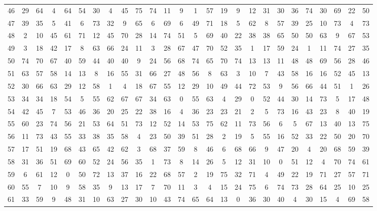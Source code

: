 \begin{table}
\begin{tabular}{c c c c c c c c c c c c c c c c c c c c c c c c c c }
46 & 29 & 64 & 4 & 64 & 54 & 30 & 4 & 45 & 75 & 74 & 11 & 9 & 1 & 57 & 19 & 9 & 12 & 31 & 30 & 36 & 74 & 30 & 69 & 22 & 50 \\
47 & 39 & 35 & 5 & 41 & 6 & 73 & 32 & 9 & 65 & 6 & 69 & 6 & 49 & 71 & 18 & 5 & 62 & 8 & 57 & 39 & 25 & 10 & 73 & 4 & 73 \\
48 & 2 & 10 & 45 & 61 & 71 & 12 & 45 & 70 & 28 & 14 & 74 & 51 & 5 & 69 & 40 & 22 & 38 & 38 & 65 & 50 & 50 & 63 & 9 & 67 & 53 \\
49 & 3 & 18 & 42 & 17 & 8 & 63 & 66 & 24 & 11 & 3 & 28 & 67 & 47 & 70 & 52 & 35 & 1 & 17 & 59 & 24 & 1 & 11 & 74 & 27 & 35 \\
50 & 74 & 70 & 67 & 40 & 59 & 44 & 40 & 40 & 9 & 24 & 56 & 68 & 74 & 65 & 70 & 74 & 13 & 13 & 11 & 48 & 48 & 69 & 56 & 28 & 46 \\
51 & 63 & 57 & 58 & 14 & 13 & 8 & 16 & 55 & 31 & 66 & 27 & 48 & 56 & 8 & 63 & 3 & 10 & 7 & 43 & 58 & 16 & 16 & 52 & 45 & 13 \\
52 & 30 & 66 & 63 & 29 & 12 & 58 & 1 & 4 & 18 & 67 & 55 & 12 & 29 & 10 & 49 & 44 & 72 & 53 & 9 & 56 & 66 & 44 & 51 & 1 & 26 \\
53 & 34 & 34 & 18 & 54 & 5 & 55 & 62 & 67 & 67 & 34 & 63 & 0 & 55 & 63 & 4 & 29 & 0 & 52 & 44 & 30 & 14 & 73 & 5 & 17 & 48 \\
54 & 42 & 45 & 7 & 53 & 46 & 36 & 20 & 25 & 22 & 38 & 16 & 4 & 36 & 23 & 23 & 21 & 2 & 5 & 73 & 16 & 43 & 23 & 8 & 40 & 19 \\
55 & 60 & 23 & 74 & 56 & 21 & 53 & 64 & 51 & 73 & 12 & 52 & 14 & 53 & 75 & 62 & 11 & 73 & 56 & 6 & 5 & 67 & 13 & 40 & 13 & 75 \\
56 & 11 & 73 & 43 & 55 & 33 & 38 & 35 & 58 & 4 & 23 & 50 & 39 & 51 & 28 & 2 & 19 & 5 & 55 & 16 & 52 & 33 & 22 & 50 & 20 & 70 \\
57 & 17 & 51 & 19 & 68 & 43 & 65 & 42 & 62 & 3 & 68 & 37 & 59 & 8 & 46 & 6 & 68 & 66 & 9 & 47 & 20 & 4 & 20 & 68 & 59 & 39 \\
58 & 31 & 36 & 51 & 69 & 60 & 52 & 24 & 56 & 35 & 1 & 73 & 8 & 14 & 26 & 5 & 12 & 31 & 10 & 0 & 51 & 12 & 4 & 70 & 74 & 61 \\
59 & 6 & 61 & 12 & 0 & 50 & 72 & 13 & 37 & 16 & 22 & 68 & 57 & 2 & 19 & 75 & 32 & 71 & 4 & 49 & 22 & 19 & 71 & 27 & 57 & 71 \\
60 & 55 & 7 & 10 & 9 & 58 & 35 & 9 & 13 & 17 & 7 & 70 & 11 & 3 & 4 & 15 & 24 & 75 & 6 & 74 & 73 & 28 & 64 & 25 & 10 & 25 \\
61 & 33 & 59 & 9 & 48 & 31 & 10 & 63 & 27 & 30 & 10 & 43 & 74 & 65 & 64 & 13 & 0 & 36 & 30 & 40 & 4 & 30 & 15 & 4 & 69 & 58 \\

\end{tabular}
\end{table}
